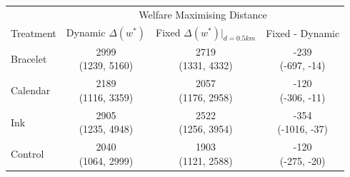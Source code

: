 
\centering

\centering
\begin{tabular}[t]{lccc}
\toprule
\multicolumn{1}{c}{ } & \multicolumn{3}{c}{Welfare Maximising Distance} \\
\cmidrule(l{3pt}r{3pt}){2-4}
Treatment & Dynamic $\Delta(w^*)$ & Fixed $\Delta(w^*)|_{d=0.5km}$ & Fixed - Dynamic\\
\midrule
Bracelet & \makecell[c]{2999\\(1239, 5160)} & \makecell[c]{2719\\(1331, 4332)} & \makecell[c]{-239\\(-697, -14)}\\
Calendar & \makecell[c]{2189\\(1116, 3359)} & \makecell[c]{2057\\(1176, 2958)} & \makecell[c]{-120\\(-306, -11)}\\
Ink & \makecell[c]{2905\\(1235, 4948)} & \makecell[c]{2522\\(1256, 3954)} & \makecell[c]{-354\\(-1016, -37)}\\
\midrule
Control & \makecell[c]{2040\\(1064, 2999)} & \makecell[c]{1903\\(1121, 2588)} & \makecell[c]{-120\\(-275, -20)}\\
\bottomrule
\end{tabular}


